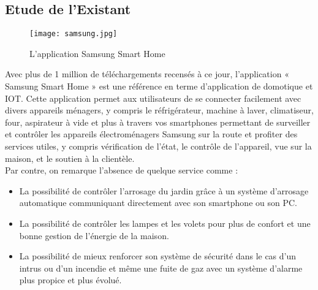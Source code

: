 \begin{spacing}{1.2}
\subsection{Etude de l'Existant}
\begin{figure}[!ht]\centering
\texttt{[image: samsung.jpg]}
\caption{L'application Samsung Smart Home}
\label{fig:fig1}
\end{figure}
Avec plus de 1 million de téléchargements recensés à ce jour, l’application « Samsung Smart Home » est une référence en terme d’application de domotique et IOT.
Cette application permet aux utilisateurs de se connecter facilement avec divers appareils ménagers, y compris le réfrigérateur, machine à laver, climatiseur, four, aspirateur à vide et plus à travers vos smartphones permettant de surveiller et contrôler les appareils électroménagers Samsung sur la route et profiter des services utiles, y compris vérification de l'état, le contrôle de l'appareil, vue sur la maison, et le soutien à la clientèle.\\
Par contre, on remarque l’absence de quelque service comme :
\begin{itemize}
\item La possibilité de contrôler l’arrosage du jardin grâce à un système d’arrosage automatique communiquant directement avec son smartphone ou son PC.
\item La possibilité de contrôler les lampes et les volets pour plus de confort et une bonne gestion de l’énergie de la maison.
\item La possibilité de mieux renforcer son système de sécurité dans le cas d’un intrus ou d’un incendie et même une fuite de gaz avec un système d’alarme plus propice et plus évolué.
\end{itemize}



\end{spacing}
